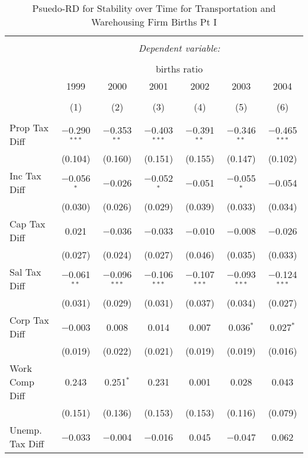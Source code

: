 
\begin{table}[!htbp] \centering 
  \caption{Psuedo-RD for Stability over Time for  Transportation and Warehousing Firm Births Pt I} 
  \label{48-49year} 
\small 
\begin{tabular}{@{\extracolsep{5pt}}lcccccc} 
\\[-1.8ex]\hline 
\hline \\[-1.8ex] 
 & \multicolumn{6}{c}{\textit{Dependent variable:}} \\ 
\cline{2-7} 
\\[-1.8ex] & \multicolumn{6}{c}{births ratio} \\ 
 & 1999 & 2000 & 2001 & 2002 & 2003 & 2004 \\ 
\\[-1.8ex] & (1) & (2) & (3) & (4) & (5) & (6)\\ 
\hline \\[-1.8ex] 
 Prop Tax Diff & $-$0.290$^{***}$ & $-$0.353$^{**}$ & $-$0.403$^{***}$ & $-$0.391$^{**}$ & $-$0.346$^{**}$ & $-$0.465$^{***}$ \\ 
  & (0.104) & (0.160) & (0.151) & (0.155) & (0.147) & (0.102) \\ 
  Inc Tax Diff & $-$0.056$^{*}$ & $-$0.026 & $-$0.052$^{*}$ & $-$0.051 & $-$0.055$^{*}$ & $-$0.054 \\ 
  & (0.030) & (0.026) & (0.029) & (0.039) & (0.033) & (0.034) \\ 
  Cap Tax Diff & 0.021 & $-$0.036 & $-$0.033 & $-$0.010 & $-$0.008 & $-$0.026 \\ 
  & (0.027) & (0.024) & (0.027) & (0.046) & (0.035) & (0.033) \\ 
  Sal Tax Diff & $-$0.061$^{**}$ & $-$0.096$^{***}$ & $-$0.106$^{***}$ & $-$0.107$^{***}$ & $-$0.093$^{***}$ & $-$0.124$^{***}$ \\ 
  & (0.031) & (0.029) & (0.031) & (0.037) & (0.034) & (0.027) \\ 
  Corp Tax Diff & $-$0.003 & 0.008 & 0.014 & 0.007 & 0.036$^{*}$ & 0.027$^{*}$ \\ 
  & (0.019) & (0.022) & (0.021) & (0.019) & (0.019) & (0.016) \\ 
  Work Comp Diff & 0.243 & 0.251$^{*}$ & 0.231 & 0.001 & 0.028 & 0.043 \\ 
  & (0.151) & (0.136) & (0.153) & (0.153) & (0.116) & (0.079) \\ 
  Unemp. Tax Diff & $-$0.033 & $-$0.004 & $-$0.016 & 0.045 & $-$0.047 & 0.062 \\ 

\end{tabular}
\end{table}
